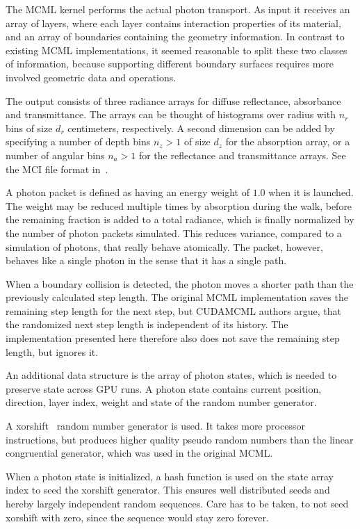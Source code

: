 \documentclass[]{article}
\begin{document}
The MCML kernel performs the actual photon transport. As input it receives an array of layers, where each layer contains interaction properties of its material, and an array of boundaries containing the geometry information. In contrast to existing MCML implementations, it seemed reasonable to split these two classes of information, because supporting different boundary surfaces requires more involved geometric data and operations.

The output consists of three radiance arrays for diffuse reflectance, absorbance and transmittance. The arrays can be thought of histograms over radius with $n_r$ bins of size $d_r$ centimeters, respectively. A second dimension can be added by specifying a number of depth bins $n_z > 1$ of size $d_z$ for the absorption array, or a number of angular bins $n_a > 1$ for the reflectance and transmittance arrays. See the MCI file format in~\cite{wang1992monte}.

A photon packet is defined as having an energy weight of $1.0$ when it is launched. The weight may be reduced multiple times by absorption during the walk, before the remaining fraction is added to a total radiance, which is finally normalized by the number of photon packets simulated. This reduces variance, compared to a simulation of photons, that really behave atomically. The packet, however, behaves like a single photon in the sense that it has a single path.

When a boundary collision is detected, the photon moves a shorter path than the previously calculated step length. The original MCML implementation saves the remaining step length for the next step, but CUDAMCML authors argue, that the randomized next step length is independent of its history. The implementation presented here therefore also does not save the remaining step length, but ignores it.

An additional data structure is the array of photon states, which is needed to preserve state across GPU runs. A photon state contains current position, direction, layer index, weight and state of the random number generator.

A xorshift~\cite{marsaglia2003xorshift} random number generator is used. It takes more processor instructions, but produces higher quality pseudo random numbers than the linear congruential generator, which was used in the original MCML.

When a photon state is initialized, a hash function is used on the state array index to seed the xorshift generator. This ensures well distributed seeds and hereby largely independent random sequences. Care has to be taken, to not seed xorshift with zero, since the sequence would stay zero forever.
\end{document}
